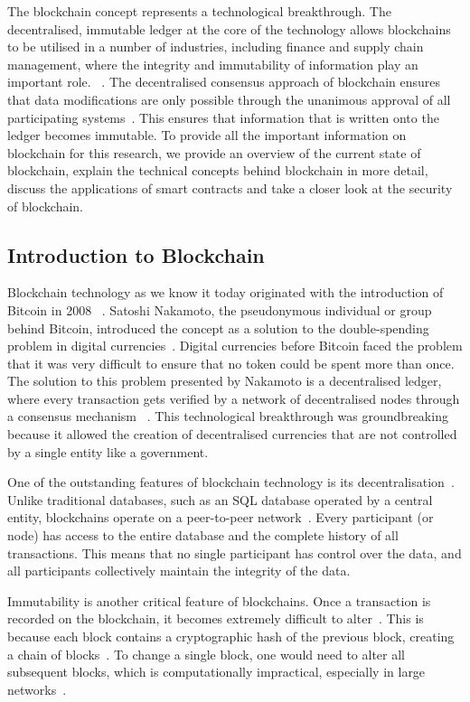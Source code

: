 
The blockchain concept represents a technological breakthrough. The decentralised, immutable ledger  at the core of the technology allows blockchains to be utilised in a number of industries, including finance and supply chain management, where the integrity and immutability of information play an important role. ~\cite{Zhou.2023}. The decentralised consensus approach of blockchain ensures that data modifications are only possible through the unanimous approval of all participating systems~\cite{Zhang.2022}. This ensures that information that is written onto the ledger becomes immutable. To provide all the important information on blockchain for this research, we provide an overview of the current state of blockchain, explain the technical concepts behind blockchain in more detail, discuss the applications of smart contracts and take a closer look at the security of blockchain.

\subsection{Introduction to Blockchain}
Blockchain technology as we know it today originated with the introduction of Bitcoin in 2008 ~\cite{Nakamoto.2009}. 
Satoshi Nakamoto, the pseudonymous individual or group behind Bitcoin, introduced the concept as a solution to the double-spending problem in digital currencies~\cite{Nakamoto.2009}. Digital currencies before Bitcoin faced the problem that it was very difficult to ensure that no token could be spent more than once. The solution to this problem presented by Nakamoto is a decentralised ledger, where every transaction gets verified by a network of decentralised nodes through a consensus mechanism ~\cite{Chiu.2022}. This technological breakthrough was groundbreaking because it allowed the creation of decentralised currencies that are not controlled by a single entity like a government.


One of the outstanding features of blockchain technology is its decentralisation~\cite{Gencer.2018}. Unlike traditional databases, such as an SQL database operated by a central entity, blockchains operate on a peer-to-peer network~\cite{Gencer.2018}. Every participant (or node) has access to the entire database and the complete history of all transactions. This means that no single participant has control over the data, and all participants collectively maintain the integrity of the data.

Immutability is another critical feature of blockchains. Once a transaction is recorded on the blockchain, it becomes extremely difficult to alter~\cite{Pilkington.}. This is because each block contains a cryptographic hash of the previous block, creating a chain of blocks~\cite{Pilkington.}. To change a single block, one would need to alter all subsequent blocks, which is computationally impractical, especially in large networks~\cite{ContedeLeon.2017}.

